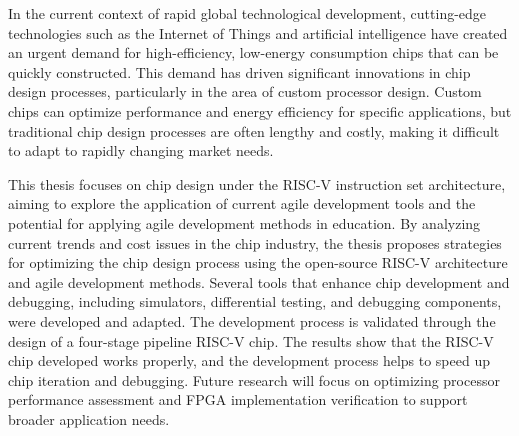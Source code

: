 In the current context of rapid global technological development, cutting-edge technologies such as the Internet of Things and artificial intelligence have created an urgent demand for high-efficiency, low-energy consumption chips that can be quickly constructed. This demand has driven significant innovations in chip design processes, particularly in the area of custom processor design. Custom chips can optimize performance and energy efficiency for specific applications, but traditional chip design processes are often lengthy and costly, making it difficult to adapt to rapidly changing market needs.

This thesis focuses on chip design under the RISC-V instruction set architecture, aiming to explore the application of current agile development tools and the potential for applying agile development methods in education. By analyzing current trends and cost issues in the chip industry, the thesis proposes strategies for optimizing the chip design process using the open-source RISC-V architecture and agile development methods. Several tools that enhance chip development and debugging, including simulators, differential testing, and debugging components, were developed and adapted. The development process is validated through the design of a four-stage pipeline RISC-V chip. The results show that the RISC-V chip developed works properly, and the development process helps to speed up chip iteration and debugging. Future research will focus on optimizing processor performance assessment and FPGA implementation verification to support broader application needs.